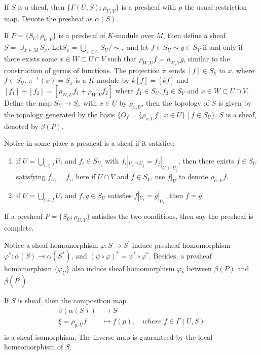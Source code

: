 \documentclass[twoside]{article}
\begin{document}
If $S$ is a sheaf, then $\{\Gamma(U,S);\rho_{U,V}\}$ is a presheaf with $\rho$ the usual restriction map. Denote the presheaf as $\alpha(S)$.

If $P=\{S_U;\rho_{U,V}\}$ is a presheaf of $K$-module over $M$, then  define a sheaf $S=\cup_{x\in M} S_x$. Let$S_x=\bigcup_{x\in U}S_U/\sim,$ and let $f\in S_U\sim g\in S_V$ if and only if there exists some $x\in W\subset U\cap V$ such that $\rho_{W,U}f=\rho_{W,V}g$, similar to the construction of germs of functions.  The projection $\pi$ sends $[f]\in S_x$ to $x$, where $f\in S_U$. $\pi^{-1}(x)=S_x$ is a $K$-module by $k[f]=[kf]$ and $[f_1]+[f_2]=[\rho_{W,U}f_1+\rho_{W,V}f_2]$ where $f_1\in S_U,f_2\in S_V$ and $x\in W\subset U\cap V$. Define the map $S_U\to S_x$ with $x\in U$ by  $\rho_{x,U}$, then the topology of $S$ is given by the topology generated by the basis $\{O_f=\{\rho_{x,U}f\mid x\in U\} \mid f\in S_U\}$. $S$ is a sheaf, denoted   by $\beta(P)$.



Notice in some place a presheaf is a sheaf if it satisfies:

\begin{enumerate}
  \item if $U=\bigcup_{i\in I} U_i$ and $f_i\in S_{U_i}$ with $f_i|_{U_i\cap U_j}=f_j|_{U_i\cap U_j}$, then there exists  $f\in S_U$ satisfying $f_{U_i}=f_i$, here if $U\cap V$ and $f\in S_V$,  use $f|_{U} $ to denote $\rho_{U,V}f$.
  \item if $U=\bigcup_{i\in I} U_i$ and  $f,g\in S_U$ satisfies $f|_{U_i}=g|_{U_i}$, then $f=g$.
\end{enumerate}


If a presheaf $P=\{S_U;\rho_{U,V}\}$  satisfies the two conditions, then  say the presheaf is complete.

Notice a sheaf homomorphism $\varphi\colon S\to S^\prime$ induce presheaf homomorphism $\varphi^*\colon \alpha(S)\to \alpha(S^*)$,  and $(\psi\circ \varphi)^*=\psi^*\circ \varphi^*$. Besides, a presheaf homomorphism $\{\varphi_U\}$  also induce sheaf homomorphism $\varphi_*$ between $\beta(P)$ and $\beta(P^\prime)$.

If $S$ is sheaf, then the composition map  $$\begin{aligned}
\beta(\alpha(S))&\to S\\
\xi=\rho_{p,U}f&\mapsto f(p),\quad  where \,\, f\in \Gamma(U,S)\\
\end{aligned}
$$
 is a sheaf isomorphism. The inverse map is guaranteed by the local homeomorphism of $S$.
\end{document}
